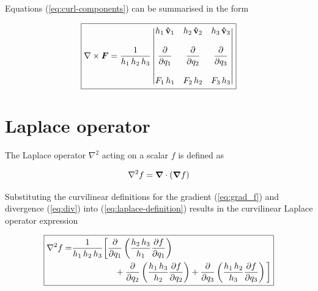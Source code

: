 \documentclass[twoside, a4paper]{article}
\begin{document}
Equations (\ref{eq:curl-components}) can be summarised in the form

\begin{equation}
\label{eq:curl}
\boxed{
\displaystyle
\nabla \times \mbox{\boldmath$ F $} = 
\frac{1}{h_1 \, h_2 \, h_3}
\begin{vmatrix}
h_1 \, \mathbf{\hat{v}}_1	&		h_2 \, \mathbf{\hat{v}}_2		&		h_3 \, \mathbf{\hat{v}}_3 \\
 & & \\
\displaystyle \frac{\partial }{\partial q_1}	&	\displaystyle \frac{\partial }{\partial q_2}	&	\displaystyle \frac{\partial }{\partial q_3} \\
 & & \\
F_1 \, h_1		&		F_2 \, h_2		&		F_3 \, h_3
\end{vmatrix}
}
\end{equation}

\section{Laplace operator}

The Laplace operator $\nabla^2$ acting on a scalar $f$ is defined as

\begin{equation}
\label{eq:laplace-definition}
\nabla^2 f = \mbox{\boldmath$ \nabla $} \cdot \left( \mbox{\boldmath$ \nabla $} f \right)
\end{equation}

Substituting the curvilinear definitions for the gradient (\ref{eq:grad_f}) and divergence (\ref{eq:div}) into (\ref{eq:laplace-definition}) results in the curvilinear Laplace operator expression

\begin{equation}
\label{eq:laplace}
\boxed{
\begin{split}
\nabla^2 f = & 
\frac{1}{h_1 \, h_2 \, h_3}
\bigg[
\frac{\partial }{\partial q_1} \left( \frac{h_2 \, h_3}{h_1} \frac{\partial f}{\partial q_1} \right) \\
& \quad \quad \quad \quad \quad
+ \frac{\partial }{\partial q_2} \left( \frac{h_1 \, h_3}{h_2} \frac{\partial f}{\partial q_2} \right) +
\frac{\partial }{\partial q_3} \left( \frac{h_1 \, h_2}{h_3} \frac{\partial f}{\partial q_3} \right)
\bigg]
\end{split}
}
\end{equation}
\end{document}
